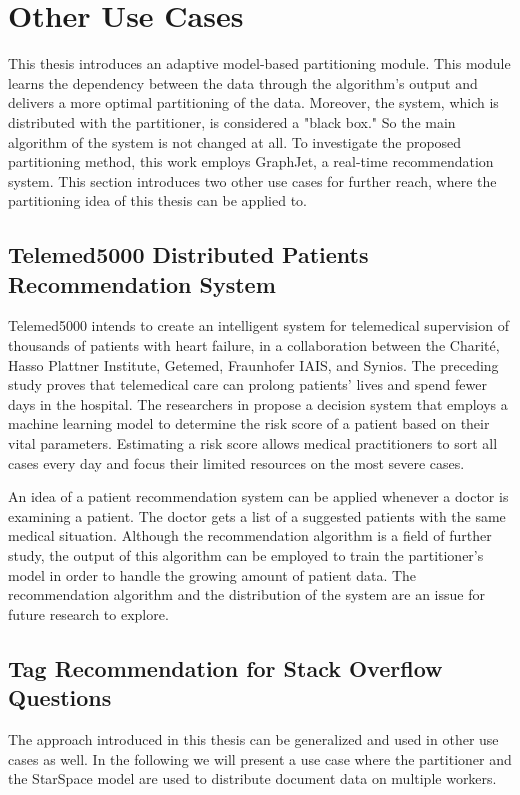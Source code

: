 \section{Other Use Cases}
\label{sec:other-use-cases}
This thesis introduces an adaptive model-based partitioning module. This module learns the dependency between the data through the algorithm's output and delivers a more optimal partitioning of the data. Moreover, the system, which is distributed with the partitioner, is considered a "black box." So the main algorithm of the system is not changed at all. To investigate the proposed partitioning method, this work employs GraphJet, a real-time recommendation system. This section introduces two other use cases for further reach, where the partitioning idea of this thesis can be applied to.

\subsection{Telemed5000 Distributed Patients Recommendation System}
\label{subsec:telemed5000}
Telemed5000 intends to create an intelligent system for telemedical supervision of thousands of patients with heart failure, in a collaboration between the Charité, Hasso Plattner Institute, Getemed, Fraunhofer IAIS, and Synios. The preceding study \cite{koehlerEfficacyTelemedicalInterventional2018} proves that telemedical care can prolong patients' lives and spend fewer days in the hospital. The researchers in \cite{gontarskaPredictingMedicalInterventions2021} propose a decision system that employs a machine learning model to determine the risk score of a patient based on their vital parameters. Estimating a risk score allows medical practitioners to sort all cases every day and focus their limited resources on the most severe cases. 


An idea of a patient recommendation system can be applied whenever a doctor is examining a patient. The doctor gets a list of a suggested patients with the same medical situation. Although the recommendation algorithm is a field of further study, the output of this algorithm can be employed to train the partitioner's model in order to handle the growing amount of patient data. The recommendation algorithm and the distribution of the system are an issue for future research to explore.


\subsection{Tag Recommendation for Stack Overflow Questions}
\label{subsec:stackoverflow-tag-recommendation}
The approach introduced in this thesis can be generalized and used in other use cases as well. In the following we will present a use case where the partitioner and the StarSpace model are used to distribute document data on multiple workers.


